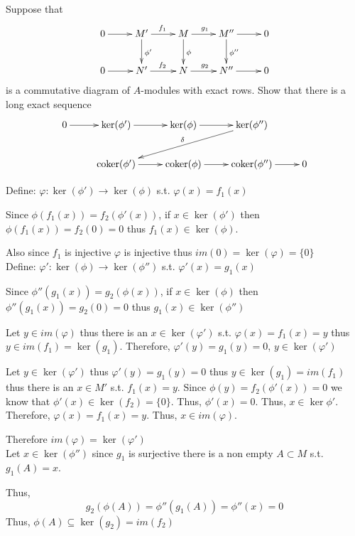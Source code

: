 \documentclass[12pt, letterpaper]{article}
\newcommand{\coker}{\mathrm{coker}}
\begin{document}
\begin{problem}{}
    Suppose that 
\[
\xymatrix{
0 \ar[r] & M' \ar[r]^{f_1}  \ar[d]^{\phi'}  & M \ar[r]^{g_1} \ar[d]^{\phi} & M'' \ar[r] \ar[d]^{\phi''} & 0 \\
0 \ar[r]& N' \ar[r]^{f_2} & N \ar[r]^{g_2} & N'' \ar[r]& 0 
}
\]
is a commutative diagram of $A$-modules with exact rows. Show that there is a long exact sequence
\[
\xymatrix{
0 \ar[r] & \ker(\phi')  \ar[r]  & \ker(\phi)  \ar[r]  & \ker(\phi'')  \ar[dll]_{\delta} \\
 & \coker(\phi')  \ar[r] & \coker(\phi)  \ar[r]& \coker(\phi'') \ar[r]& 0
}
\]
\end{problem}
\begin{problemproof}
    Define: $\varphi: \ker(\phi') \to \ker(\phi)$ s.t. $\varphi(x)=f_1(x)$

    Since $\phi(f_1(x))=f_2(\phi'(x))$, if $x \in \ker(\phi')$ then $\phi(f_1(x))=f_2(0)=0$ thus $f_1(x) \in \ker(\phi)$.

    Also since $f_1$ is injective $\varphi$ is injective thus $im(0)=\ker(\varphi)=\{0\}$\\

    Define: $\varphi': \ker(\phi) \to \ker(\phi'')$ s.t. $\varphi'(x)=g_1(x)$

    Since $\phi''(g_1(x))=g_2(\phi(x))$, if $x \in \ker(\phi)$ then $\phi''(g_1(x))=g_2(0)=0$ thus $g_1(x) \in \ker(\phi'')$

    Let $y \in im(\varphi)$ thus there is an $x \in \ker(\varphi')$ s.t. $\varphi(x)=f_1(x)=y$ thus $y \in im(f_1)=\ker(g_1)$. Therefore, $\varphi'(y)=g_1(y)=0$, $y \in \ker(\varphi')$

    Let $y \in \ker(\varphi')$ thus $\varphi'(y)=g_1(y)=0$ thus $y \in \ker(g_1)=im(f_1)$ thus there is an $x \in M'$ s.t. $f_1(x)=y$. Since $\phi(y)=f_2(\phi'(x))=0$ we know that $\phi'(x) \in \ker(f_2)=\{0\}$. Thus, $\phi'(x)=0$. Thus, $x \in \ker{\phi'}$. Therefore, $\varphi(x)=f_1(x)=y$. Thus, $x \in im(\varphi)$.

    Therefore $im(\varphi)=\ker(\varphi')$\\

    Let $x \in \ker(\phi'')$ since $g_1$ is surjective there is a non empty $A \subset M$ s.t. $g_1(A)=x$.

    Thus,
    \[g_2(\phi(A))=\phi''(g_1(A))=\phi''(x)=0\]
    Thus, $\phi(A) \subseteq \ker (g_2)=im(f_2)$


\end{problemproof}
\end{document}
